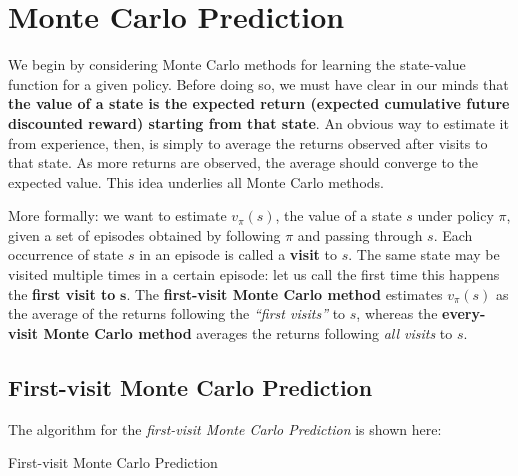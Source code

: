 \section{Monte Carlo Prediction}
We begin by considering Monte Carlo methods for learning the state-value function for a given policy. Before doing so, we must have clear in our minds that \textbf{the value of a state is the expected return (expected cumulative future discounted reward) starting from that state}. An obvious way to estimate it from experience, then, is simply to average the returns observed after visits to that state. As more returns are observed, the average should converge to the expected value. This idea underlies all Monte Carlo methods.

More formally: we want to estimate $v_\pi (s)$, the value of a state $s$ under policy $\pi$, given a set of episodes obtained by following $\pi$ and passing through $s$. Each occurrence of state $s$ in an episode is called a \textbf{visit} to $s$. The same state may be visited multiple times in a certain episode: let us call the first time this happens the \textbf{first visit to} $\boldsymbol{s}$. The \textbf{first-visit Monte Carlo method} estimates $v_\pi (s)$ as the average of the returns following the \textit{``first visits''} to $s$, whereas the \textbf{every-visit Monte Carlo method} averages the returns following \textit{all visits} to $s$.

\subsection{First-visit Monte Carlo Prediction}
The algorithm for the \textit{first-visit Monte Carlo Prediction} is shown here:

\begin{algorithm}[H]
\SetAlgoLined
{}

 \caption{First-visit Monte Carlo Prediction}
\end{algorithm}

